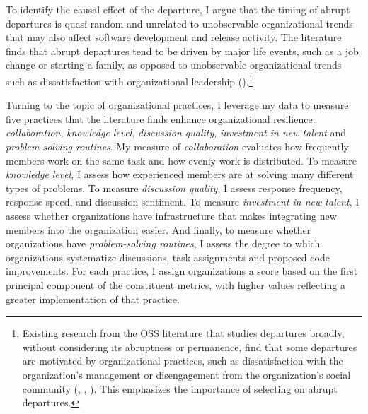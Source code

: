 \documentclass[12pt,notitlepage]{article}
\begin{document}
To identify the causal effect of the departure, I argue that the timing of abrupt departures is quasi-random and unrelated to unobservable organizational trends that may also affect software development and release activity.
The literature finds that abrupt departures tend to be driven by major life events, such as a job change or starting a family, as opposed to unobservable organizational trends such as dissatisfaction with organizational leadership (\citealt{miller_why_2019}).\footnote{Existing research from the OSS literature that studies departures broadly, without considering its abruptness or permanence, find that some departures are motivated by organizational practices, such as dissatisfaction with the organization's management or disengagement from the organization's social community (\citealt{hannon_retaining_2008}, \citealt{constantinou_empirical_2017}, \citealt{miller_why_2019}).
This emphasizes the importance of selecting on abrupt departures.}





Turning to the topic of organizational practices, I leverage my data to measure five practices that the literature finds enhance organizational resilience: \textit{collaboration}, \textit{knowledge level}, \textit{discussion quality}, \textit{investment in new talent} and \textit{problem-solving routines}.
My measure of \textit{collaboration} evaluates how frequently members work on the same task and how evenly work is distributed.
To measure \textit{knowledge level}, I assess how experienced members are at solving many different types of problems.
To measure \textit{discussion quality}, I assess response frequency, response speed, and discussion sentiment.
To measure \textit{investment in new talent}, I assess whether organizations have infrastructure that makes integrating new members into the organization easier.
And finally, to measure whether organizations have \textit{problem-solving routines}, I assess the degree to which organizations systematize discussions, task assignments and proposed code improvements.
For each practice, I assign organizations a score based on the first principal component of the constituent metrics, with higher values reflecting a greater implementation of that practice.
\end{document}
